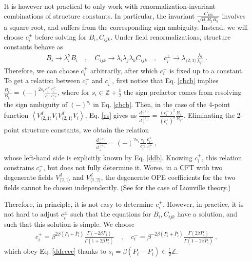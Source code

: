 \documentclass[12pt, a4paper]{article}
\theoremstyle{break}
\begin{document}
It is however not practical to only work with renormalization-invariant combinations of structure constants. In particular, the invariant $\frac{C_{123}}{\sqrt{B_1B_2B_3}}$ involves a square root, and suffers from the corresponding sign ambiguity. Instead, we will choose $c_i^\pm$ before solving for $B_i,C_{ijk}$. Under field renormalizations, structure constants behave as 
\begin{align}
 B_i \to \lambda_i^2 B_i \quad ,\quad C_{ijk}\to \lambda_i\lambda_j\lambda_k C_{ijk} \quad , \quad c_i^\pm \to \lambda_{\langle 2,1\rangle} \frac{\lambda_i}{\lambda_{i^\pm}}\ . 
\end{align}
Therefore, we can choose $c_i^+$ arbitrarily, after which $c_i^-$ is fixed up to a constant. To get a relation between $c_i^-$ and $c_i^+$, first notice that Eq. \eqref{cbcb} implies $\frac{B_{i^-}}{B_{i^+}} =(-)^{2s_i} \frac{c_i^+}{c_i^-}\frac{c_{i^-}^+}{c_{i^+}^-}$, where for $s_i\in\mathbb{Z}+\frac12$ the sign prefactor 
comes from resolving the sign ambiguity of $(-)^{s_i}$ in Eq. \eqref{cbcb}.
Then, in the case of the 4-point function $\left<V_{\langle 2,1\rangle}^d V_iV_{\langle 2,1\rangle}^d V_i\right>$, Eq. \eqref{cs} gives us $\frac{d^{(s)}_-}{d^{(s)}_+}=\frac{(c_i^-)^2}{(c_i^+)^2} \frac{B_{i^-}}{B_{i^+}}$. Eliminating the 2-point structure constants, we obtain the relation
\begin{align}
 \frac{d^{(s)}_-}{d^{(s)}_+}= (-)^{2s_i}\frac{c_i^-}{c_{i^+}^-} \frac{c_{i^-}^+}{c_i^+}\ ,  
 \label{ddcccc}
\end{align}
whose left-hand side is explicitly known by Eq. \eqref{ddb}. Knowing $c_i^+$, this relation constrains $c_i^-$, but does not fully determine it. Worse, in a CFT with two degenerate fields $V^d_{\langle 2,1\rangle}$ and $V^d_{\langle 1,2\rangle}$, the degenerate OPE coefficients for the two fields cannot be chosen independently. (See \cite[Exercise 3.2]{rib14} for the case of Liouville theory.)  

Therefore, in principle, it is not easy to determine $c_i^\pm$. However, in practice, it is not hard to adjust $c_i^\pm$ such that the equations for $B_i,C_{ijk}$ have a solution, and such that this solution is simple.
We choose
\begin{align}
 c^+_i = \beta^{2\beta(P_i+\bar P_i)} \frac{\Gamma(-2\beta P_i)}{\Gamma(1+2\beta \bar P_i)} \quad , \quad c^-_i = \beta^{-2\beta(P_i+\bar P_i)} \frac{\Gamma(2\beta P_i)}{\Gamma(1-2\beta \bar P_i)}\ ,
 \label{cpcm}
\end{align}
which obey Eq. \eqref{ddcccc} thanks to $s_i=\beta(\bar P_i-P_i) \in \frac12\mathbb{Z}$. 
\end{document}
